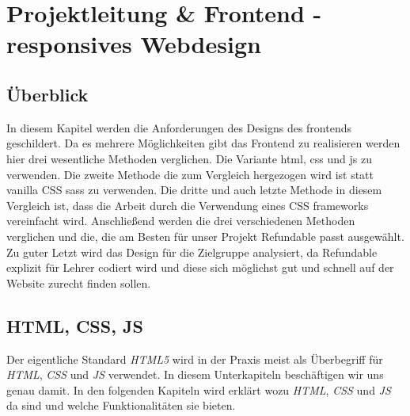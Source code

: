 \section{Projektleitung \& Frontend - responsives Webdesign}
	\subsection{Überblick}
	In diesem Kapitel werden die Anforderungen des Designs des \Gls{frontend}s geschildert. Da es mehrere Möglichkeiten gibt das Frontend zu realisieren werden hier drei wesentliche Methoden verglichen. Die Variante \Gls{html}, \Gls{css} und \Gls{js} zu verwenden. Die zweite Methode die zum Vergleich hergezogen wird ist statt \Gls{vanilla} CSS \Gls{sass} zu verwenden. Die dritte und auch letzte Methode in diesem Vergleich ist, dass die Arbeit durch die Verwendung eines CSS \Gls{framework}s vereinfacht wird. Anschließend werden die drei verschiedenen Methoden verglichen und die, die am Besten für unser Projekt Refundable passt ausgewählt. Zu guter Letzt wird das Design für die Zielgruppe analysiert, da Refundable explizit für Lehrer codiert wird und diese sich möglichst gut und schnell auf der Website zurecht finden sollen.
	
	\subsection{HTML, CSS, JS}
	Der eigentliche Standard \textit{HTML5} wird in der Praxis meist als Überbegriff für \textit{HTML}, \textit{CSS} und \textit{JS} verwendet. In diesem Unterkapiteln beschäftigen wir uns genau damit.\cite{html5-css3-handbuch} In den folgenden Kapiteln wird erklärt wozu \textit{HTML}, \textit{CSS} und \textit{JS} da sind und welche Funktionalitäten sie bieten.
	
